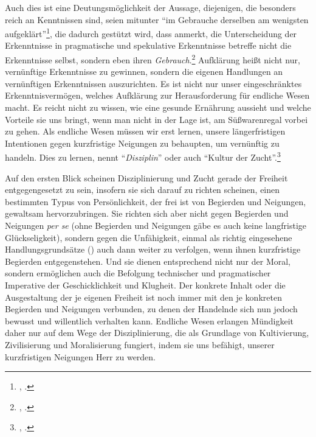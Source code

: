 Auch dies ist eine Deutungsmöglichkeit der Aussage, diejenigen, die besonders
reich an Kenntnissen sind, seien mitunter \enquote{im Gebrauche derselben am
wenigsten aufgeklärt}\footnote{\cite[][A
329]{Kant:Washeisst:SichimDenkenorientieren?1977}, \cite[][VIII:
146.34]{Kant:GesammelteWerke1900ff.}.}, die dadurch gestützt wird, dass
 anmerkt, die Unterscheidung der Erkenntnisse in
pragmatische und spekulative Erkenntnisse betreffe nicht die
Erkenntnisse selbst, sondern eben ihren
\emph{Gebrauch}.\footnote{\cite[Vgl.][]{Kant:Reflexionen1900ff.},
\cite[][XVI: 519.15--17]{Kant:GesammelteWerke1900ff.}.} Aufklärung heißt nicht
nur, vernünftige Erkenntnisse zu gewinnen, sondern die eigenen Handlungen an
vernünftigen Erkenntnissen auszurichten. Es ist nicht nur unser eingeschränktes
Erkenntnisvermögen, welches Aufklärung zur Herausforderung für endliche Wesen
macht. Es reicht nicht zu wissen, wie eine gesunde Ernährung aussieht und welche
Vorteile sie uns bringt, wenn man nicht in der Lage ist, am Süßwarenregal vorbei zu
gehen. Als endliche Wesen müssen wir erst lernen, unsere längerfristigen
Intentionen gegen kurzfristige Neigungen zu behaupten, um vernünftig zu handeln.
Dies zu lernen, nennt  \enquote{\emph{Disziplin}} oder auch \enquote{Kultur der
Zucht}.\footnote{\cite[Vgl.][\S~83]{Kant:KritikderUrteilskraft2009}, \cite[][V:
432.3--5]{Kant:GesammelteWerke1900ff.}.}

Auf den ersten Blick scheinen Disziplinierung und Zucht gerade der Freiheit
entgegengesetzt zu sein, insofern sie sich darauf zu richten scheinen, einen
bestimmten  Typus von Persönlichkeit, der frei ist von
Begierden und Neigungen, gewaltsam hervorzubringen. Sie richten sich aber nicht
gegen Begierden und Neigungen \emph{per se} (ohne Begierden und Neigungen gäbe
es auch keine langfristige Glückseligkeit), sondern gegen die Unfähigkeit,
einmal als richtig eingesehene Handlungsgrundsätze () auch
dann weiter zu verfolgen, wenn ihnen kurzfristige Begierden entgegenstehen.
Und sie dienen entsprechend nicht nur der Moral, sondern ermöglichen auch die
Befolgung technischer und pragmatischer Imperative der Geschicklichkeit und
Klugheit. Der konkrete Inhalt oder die Ausgestaltung der je eigenen Freiheit ist
noch immer mit den je konkreten Begierden und Neigungen verbunden, zu denen der
Handelnde sich nun jedoch bewusst und willentlich verhalten kann. Endliche Wesen
erlangen Mündigkeit daher nur auf dem Wege der Disziplinierung, die als
Grundlage von Kultivierung, Zivilisierung und Moralisierung fungiert, indem sie
uns befähigt, unserer kurzfristigen Neigungen Herr zu werden.



